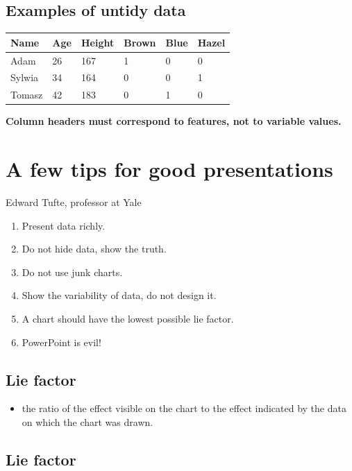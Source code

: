 \documentclass[
  english,
  letterpaper,
  DIV=11,
  numbers=noendperiod]{scrreprt}
\newcounter{none} %
\providecommand{\tightlist}{%
  \setlength{\itemsep}{0pt}\setlength{\parskip}{0pt}}
\begin{document}
\subsection{Examples of untidy data}\label{examples-of-untidy-data}

{\def\LTcaptype{none} %
\begin{longtable}[]{@{}llllll@{}}
\toprule\noalign{}
Name & Age & Height & Brown & Blue & Hazel \\
\midrule\noalign{}
\endhead
\bottomrule\noalign{}
\endlastfoot
Adam & 26 & 167 & 1 & 0 & 0 \\
Sylwia & 34 & 164 & 0 & 0 & 1 \\
Tomasz & 42 & 183 & 0 & 1 & 0 \\
\end{longtable}
}

\textbf{Column headers must correspond to features, not to variable
values.}

\section{A few tips for good
presentations}\label{a-few-tips-for-good-presentations}

Edward Tufte, professor at Yale

\begin{enumerate}
\def\labelenumi{\arabic{enumi}.}
\item
  Present data richly.
\item
  Do not hide data, show the truth.
\item
  Do not use junk charts.
\item
  Show the variability of data, do not design it.
\item
  A chart should have the lowest possible lie factor.
\item
  PowerPoint is evil!
\end{enumerate}

\subsection{Lie factor}\label{lie-factor}

\begin{itemize}
\tightlist
\item
  the ratio of the effect visible on the chart to the effect indicated
  by the data on which the chart was drawn.
\end{itemize}

\subsection{Lie factor}\label{lie-factor-1}
\end{document}
